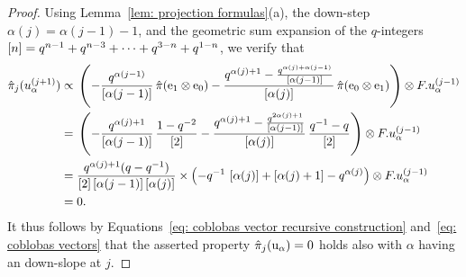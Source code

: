 \documentclass[oneside,english]{amsart}
\numberwithin{equation}{section}
\numberwithin{figure}{section}
\theoremstyle{plain}
\theoremstyle{plain}
\theoremstyle{plain}
\theoremstyle{remark}
\theoremstyle{plain}
\theoremstyle{plain}
\theoremstyle{plain}
\theoremstyle{plain}
\theoremstyle{plain}
\theoremstyle{plain}
\theoremstyle{plain}
\theoremstyle{plain}
\begin{document}
\begin{proof}
Using Lemma~\ref{lem: projection formulas}(a), the down-step
$\alpha(j) = \alpha(j-1)-1$, and the geometric sum expansion
of the $q$-integers $\left[n\right] = q^{n-1} + q^{n-3} + \cdots + q^{3-n} + q^{1-n}$, %
we verify that
\begin{align*}
\hat{\pi}_j(u_\alpha^{(j+1)})
\propto \; &  
\left(
- \frac{q^{\alpha(j-1)}}{\left[\alpha(j-1)\right]}\,
\hat{\pi} ( \mathrm{e}_1 \otimes \mathrm{e}_0 )
- \frac{q^{\alpha(j)+1} - \frac{q^{\alpha(j)+\alpha(j-1)}}{\left[\alpha(j-1)\right]}}{\left[\alpha(j)\right]}\,
\hat{\pi} ( \mathrm{e}_0 \otimes \mathrm{e}_1 ) 
\right) \otimes F.u_\alpha^{(j-1)} \\
= \; & \left(
- \frac{q^{\alpha(j)+1}}{\left[\alpha(j-1)\right]}\,
\frac{1-q^{-2}}{\left[2\right]}
- \frac{q^{\alpha(j)+1} - \frac{q^{2\alpha(j)+1}}{\left[\alpha(j-1)\right]}}{\left[\alpha(j)\right]}\, \frac{q^{-1}-q}{\left[2\right]} \right) \otimes F.u_\alpha^{(j-1)} \\
= \; & \frac{q^{\alpha(j)+1}(q-q^{-1})}{\left[2\right] \left[\alpha(j-1)\right] \left[\alpha(j)\right]} \times 
\left( - q^{-1}\,\left[\alpha(j)\right]
+ \left[\alpha(j)+1\right] - q^{\alpha(j)} \right) \otimes F.u_\alpha^{(j-1)}  \\
= \; & 0.
\end{align*}
It thus follows by 
Equations~\eqref{eq: coblobas vector recursive construction} 
and~\eqref{eq: coblobas vectors} 
that the asserted property $\hat{\pi}_j(\mathrm{u}_\alpha) = 0$ holds
also with $\alpha$ having an down-slope at $j$.


\end{proof}
\end{document}
